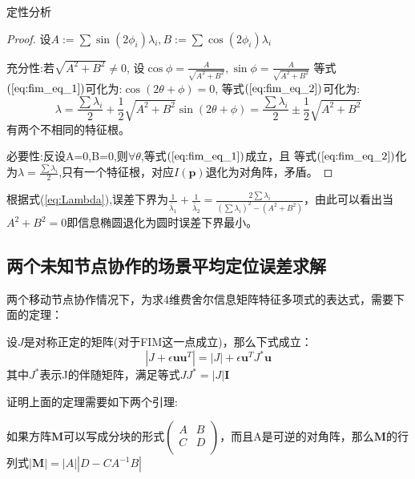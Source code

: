 {定性分析}
\begin{proof}
设$A:=\sum\sin(2\phi_i)\lambda_i,B:=\sum\cos(2\phi_i)\lambda_i$

充分性:若$\sqrt{A^2+B^2} \neq 0$,
设$\cos\phi=\frac{A}{\sqrt{A^2+B^2}},\sin\phi=\frac{A}{\sqrt{A^2+B^2}}$
等式$(\ref{eq:fim_eq_1})$可化为:$\cos(2\theta+\phi)=0$,
等式$(\ref{eq:fim_eq_2})$可化为:
\begin{equation}\label{eq:Lambda}
\lambda=\frac{\sum \lambda_i}{2}+\frac{1}{2}\sqrt{A^2+B^2}\sin(2\theta+\phi)=\frac{\sum \lambda_i}{2}\pm\frac{1}{2}\sqrt{A^2+B^2}
\end{equation}
有两个不相同的特征根。

必要性:反设A=0,B=0,则$\forall \theta$,等式$(\ref{eq:fim_eq_1})$成立，且
等式$(\ref{eq:fim_eq_2})$化为$\lambda=\frac{\sum \lambda_i}{2}$,只有一个特征根，对应$I(\bm{p})$退化为对角阵，矛盾。

\end{proof}
根据式(\ref{eq:Lambda}),误差下界为$\frac{1}{\tilde{\lambda_1}}+\frac{1}{\tilde{\lambda_2}}=\frac{2\sum \lambda_i}{(\sum \lambda_i)^2-(A^2+B^2)}$，由此可以看出当$A^2+B^2=0$即信息椭圆退化为圆时误差下界最小。

\subsection{两个未知节点协作的场景平均定位误差求解}

两个移动节点协作情况下，为求4维费舍尔信息矩阵特征多项式的表达式，需要下面的定理：
\begin{theorem}\label{thm:ShenIden}
设$J$是对称正定的矩阵(对于FIM这一点成立)，那么下式成立：
\begin{equation}\label{eq:ShenIden}
|J+\epsilon \bm{u}\bm{u}^T|=|J|+\epsilon \bm{u}^TJ^*\bm{u}
\end{equation}
其中$J^*$表示J的伴随矩阵，满足等式$JJ^*=|J|\bm{I}$
\end{theorem}
证明上面的定理需要如下两个引理:
\begin{lemma}\label{lemma:block}
如果方阵$\bm{M}$可以写成分块的形式$\left(\begin{array}{cc}
A&B\\
C&D\\
\end{array}\right)$，而且A是可逆的对角阵，那么$\bm{M}$的行列式$|\bm{M}|=|A||D-CA^{-1}B|$
\end{lemma}



